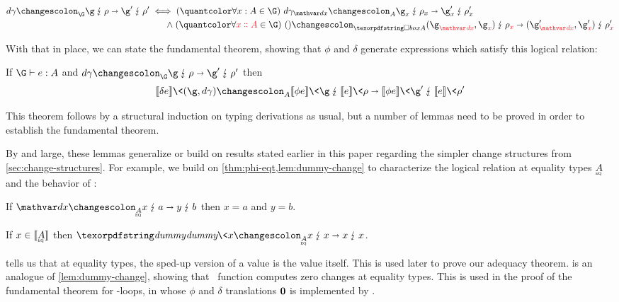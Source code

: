 \nopagebreak[1]
\begin{align*}
  \weirdat{\G}{\dgamma}{\g}{\rho}{\g'}{\rho'}
  &\iff \fa{\h x A \in \G} \weirdat{A}{\dgamma_{\dx}}{\g_x}{\rho_x}{\g'_x}{\rho'_x}
  \\
  &\hphantom{{}\iff{}} \hspace*{-13.2pt} \wedge \fa{\hd x A \in \G}
  \weirdat{\iso A}
          {\etuple{}}
          {(\g_{\dvar \dx}, \g_{\dvar x})}
          {\rho_{\dvar x}}
          {(\g'_{\dvar\dx}, \g'_{\dvar x})}
          {\rho'_{\dvar x}}
\end{align*}

\noindent
With that in place, we can state the fundamental theorem, showing that
$\phi$ and $\delta$ generate expressions which satisfy this logical
relation:

\begin{theorem}
  If\/ $\J e \G A$ and\/ $\weirdat{\G}{\dgamma}{\g}{\rho}{\g'}{\rho'}$ then
  \[\weirdat{A}{\den{\delta e} \<\tuple{\g,\dgamma}}{\den{\phi
      e}\<\g}{\den{e}\<\rho}{\den{\phi e}\<\g'}{\den{e}\<\rho'}\]
\end{theorem}

\noindent
This theorem follows by a structural induction on typing derivations as usual,
but a number of lemmas need to be proved in order to establish the fundamental
theorem.

By and large, these lemmas generalize or build on results stated
earlier in this paper regarding the simpler change structures from
\cref{sec:change-structures}.
%
For example, we build on \cref{thm:phi-eqt,lem:dummy-change} to characterize the
logical relation at equality types $\eqt A$ and the behavior of \dummy:

\begin{lemma}\label{lem:equality-changes}
  If\/ $\weirdat{\eqt A}{\dx}{x}{a}{y}{b}$ then\/ $x = a$ and\/ $y = b$.
\end{lemma}

\begin{lemma}\label{lem:lr-dummy}
  If\/ $x \in \den{\eqt A}$ then $\weirdat{\eqt A}{\dummy\<x}{x}{x}{x}{x}$.
\end{lemma}

\noindent
{} tells us that at equality types, the sped-up version
of a value is the value itself. This is used later to prove our adequacy
theorem.
%
 is an analogue of \cref{lem:dummy-change}, showing that
\dummy\ function computes zero changes at equality types.
%
This is used in the proof of the fundamental theorem for -loops,
in whose $\phi$ and $\delta$ translations $\boldsymbol 0$ is implemented by \dummy.

